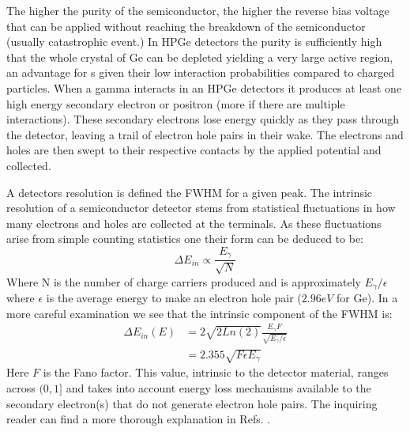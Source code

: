The higher the purity of the semiconductor, the higher the reverse bias voltage that can be applied without reaching the breakdown of the semiconductor (usually catastrophic event.) In HPGe detectors the purity is sufficiently high that the whole crystal of Ge can be depleted yielding a very large active region, an advantage for \gr{}s given their low interaction probabilities compared to charged particles. When a gamma interacts in an HPGe detectors it produces at least one high energy secondary electron or positron (more if there are multiple interactions). These secondary electrons lose energy quickly as they pass through the detector, leaving a trail of electron hole pairs in their wake. The electrons and holes are then swept to their respective contacts by the applied potential and collected.

A detectors resolution is defined the FWHM for a given peak. The intrinsic resolution of a semiconductor detector stems from statistical fluctuations in how many electrons and holes are collected at the terminals. As these fluctuations arise from simple counting statistics one their form can be deduced to be:
\begin{equation}
\label{eqn:hpge-res-est} 
\Delta{}E_{in} \propto \frac{E_{\gamma}}{\sqrt{N}}
\end{equation}
Where N is the number of charge carriers produced and is approximately $E_{\gamma}/\epsilon$ where $\epsilon$ is the average energy to make an electron hole pair ($2.96eV$ for Ge). In a more careful examination we see that the intrinsic component of the FWHM is:
\begin{equation}
\label{eqn:hpge-in-res} 
\begin{split}
\Delta{}E_{in}(E) & = 2\sqrt{2 Ln(2)}\frac{E_{\gamma{}}F}{\sqrt{E_{\gamma{}}/\epsilon{}}}\\
       & = 2.355\sqrt{F\epsilon{}E_{\gamma{}}}
\end{split}
\end{equation}
Here $F$ is the Fano factor. This value, intrinsic to the detector material, ranges across $(0,1]$ and takes into account energy loss mechanisms available to the secondary electron(s) that do not generate electron hole pairs. The inquiring reader can find a more thorough explanation in Refs. \cite{knollBook,fano_factor1}.

